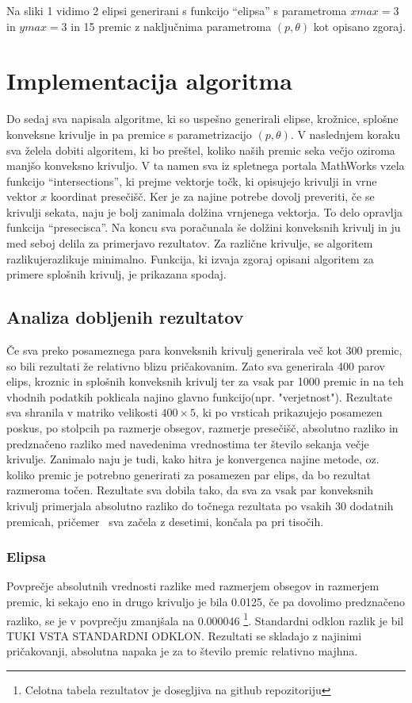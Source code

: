 \documentclass[a4paper]{article}
\begin{document}
Na sliki 1 vidimo 2 elipsi generirani s funkcijo ``elipsa'' s parametroma $xmax=3$ in $ymax=3$ in 15 premic z naključnima parametroma $(p, \theta)$ kot opisano zgoraj. 

\section{Implementacija algoritma}
Do sedaj sva napisala algoritme, ki so uspešno generirali elipse, krožnice, splošne konveksne krivulje in pa premice s parametrizacijo $(p, \theta)$. V naslednjem koraku sva želela dobiti algoritem, ki bo preštel, koliko naših premic seka večjo oziroma manjšo konveksno krivuljo. V ta namen sva iz spletnega portala MathWorks vzela funkcijo ``intersections'', ki prejme vektorje točk, ki opisujejo krivulji in vrne vektor $x$ koordinat presečišč. Ker je za najine potrebe dovolj preveriti, če se krivulji sekata, naju je bolj zanimala dolžina vrnjenega vektorja. To delo opravlja funkcija ``presecisca''. Na koncu sva poračunala še dolžini konveksnih krivulj in ju med seboj delila za primerjavo rezultatov. Za različne krivulje, se algoritem razlikujerazlikuje minimalno. Funkcija, ki izvaja zgoraj opisani algoritem za primere splošnih krivulj, je prikazana spodaj.

\subsection{Analiza dobljenih rezultatov}
Če sva preko posameznega para konveksnih krivulj generirala več kot 300 premic, so bili rezultati že relativno blizu pričakovanim. Zato sva generirala 400 parov elips, kroznic in splošnih konveksnih krivulj ter za vsak par 1000 premic in na teh vhodnih podatkih poklicala najino glavno funkcijo(npr. "verjetnost"). Rezultate sva shranila v matriko velikosti $400 \times 5$, ki po vrsticah prikazujejo posamezen poskus, po stolpcih pa razmerje obsegov, razmerje presečišč, absolutno razliko in predznačeno razliko med navedenima vrednostima ter število sekanja večje krivulje.
Zanimalo naju je tudi, kako hitra je konvergenca najine metode, oz. koliko premic je potrebno generirati za posamezen par elips, da bo rezultat razmeroma točen. Rezultate sva dobila tako, da sva za vsak par konveksnih krivulj primerjala absolutno razliko do točnega rezultata po vsakih 30 dodatnih premicah, pričemer  sva začela z desetimi, končala pa pri tisočih.


\subsubsection{Elipsa}
Povprečje absolutnih vrednosti razlike med razmerjem obsegov in razmerjem premic, ki sekajo eno in drugo krivuljo je bila 0.0125, če pa dovolimo predznačeno razliko, se je v povprečju zmanjšala na 0.000046 \footnote[1]{Celotna tabela rezultatov je dosegljiva na github repozitoriju}. Standardni odklon razlik je bil TUKI VSTA STANDARDNI ODKLON. Rezultati se skladajo z najinimi pričakovanji, absolutna napaka je za to število premic relativno majhna.
\end{document}
